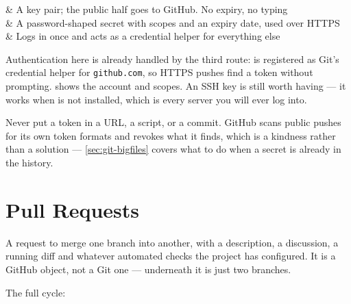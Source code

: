 \begin{keys}[0.26]
	     & A key pair; the public half goes to GitHub. No expiry, no typing \\
	 & A password-shaped secret with scopes and an expiry date, used over HTTPS \\
	 & Logs in once and acts as a credential helper for everything else \\
\end{keys}


\begin{note}
	Authentication here is already handled by the third route:  is
	registered as Git's credential helper for \texttt{github.com}, so HTTPS pushes
	find a token without prompting.  shows the account and
	scopes. An SSH key is still worth having --- it works when  is not
	installed, which is every server you will ever log into.
\end{note}

\begin{moral}
	Never put a token in a URL, a script, or a commit. GitHub scans public pushes
	for its own token formats and revokes what it finds, which is a kindness rather
	than a solution --- \autoref{sec:git-bigfiles} covers what to do when a secret
	is already in the history.
\end{moral}

\section{Pull Requests}\label{sec:gh-pr}

\begin{definition}
	A request to merge one branch into another, with a description, a discussion,
	a running diff and whatever automated checks the project has configured. It is
	a GitHub object, not a Git one --- underneath it is just two branches.
\end{definition}

The full cycle:

